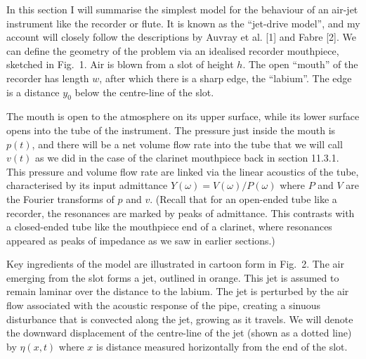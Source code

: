   In this section I will summarise the simplest model for the behaviour of an 
  air-jet instrument like the recorder or flute. It is known as the ``jet-drive 
  model'', and my account will closely follow the descriptions by Auvray et al. 
  [1] and Fabre [2]. We can define the geometry of the problem via an idealised 
  recorder mouthpiece, sketched in Fig.\ 1. Air is blown from a slot of height 
  $h$. The open ``mouth'' of the recorder has length $w$, after which there is 
  a sharp edge, the ``labium''. The edge is a distance $y_0$ below the 
  centre-line of the slot. 


  The mouth is open to the atmosphere on its upper surface, while its lower 
  surface opens into the tube of the instrument. The pressure just inside the 
  mouth is $p(t)$, and there will be a net volume flow rate into the tube that 
  we will call $v(t)$ as we did in the case of the clarinet mouthpiece back in 
  section 11.3.1. This pressure and volume flow rate are linked via the linear 
  acoustics of the tube, characterised by its input admittance 
  $Y(\omega)=V(\omega)/P(\omega)$ where $P$ and $V$ are the Fourier transforms 
  of $p$ and $v$. (Recall that for an open-ended tube like a recorder, the 
  resonances are marked by peaks of admittance. This contrasts with a 
  closed-ended tube like the mouthpiece end of a clarinet, where resonances 
  appeared as peaks of impedance as we saw in earlier sections.) 

  Key ingredients of the model are illustrated in cartoon form in Fig.\ 2. The 
  air emerging from the slot forms a jet, outlined in orange. This jet is 
  assumed to remain laminar over the distance to the labium. The jet is 
  perturbed by the air flow associated with the acoustic response of the pipe, 
  creating a sinuous disturbance that is convected along the jet, growing as it 
  travels. We will denote the downward displacement of the centre-line of the 
  jet (shown as a dotted line) by $\eta(x,t)$ where $x$ is distance measured 
  horizontally from the end of the slot. 


